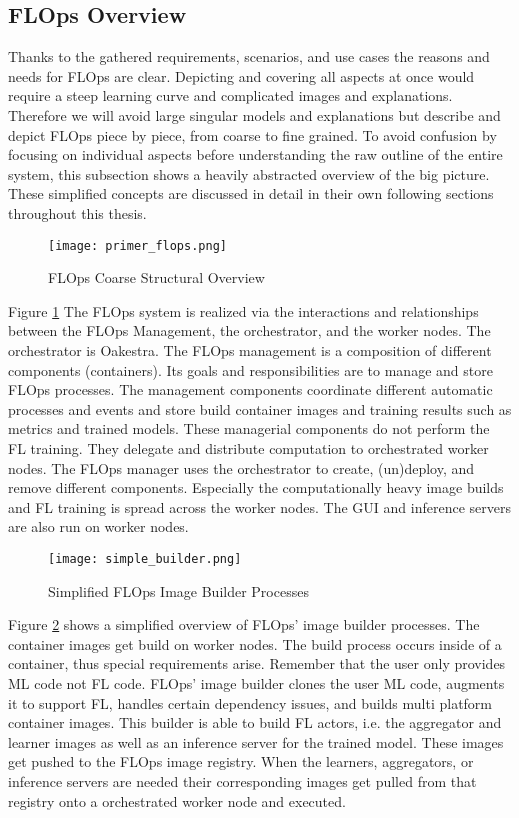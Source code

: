 \subsection{FLOps Overview}

Thanks to the gathered requirements, scenarios, and use cases the reasons and needs for FLOps are clear.
Depicting and covering all aspects at once would require a steep learning curve and complicated images and explanations.
Therefore we will avoid large singular models and explanations but describe and depict FLOps piece by piece, from coarse to fine grained.
To avoid confusion by focusing on individual aspects before understanding the raw outline of the entire system,
this subsection shows a heavily abstracted overview of the big picture.
These simplified concepts are discussed in detail in their own following sections throughout this thesis.

\begin{figure}[h]
    \centering
    \texttt{[image: primer\_flops.png]}
    \caption{FLOps Coarse Structural Overview}
    \label{fig:flops_structure_overview}
\end{figure}

Figure \ref{fig:flops_structure_overview}
The FLOps system is realized via the interactions and relationships between the FLOps Management, the orchestrator, and the worker nodes.
The orchestrator is Oakestra.
The FLOps management is a composition of different components (containers).
Its goals and responsibilities are to manage and store FLOps processes.
The management components coordinate different automatic processes and events and store build container images and training results such as metrics and trained models.
These managerial components do not perform the FL training.
They delegate and distribute computation to orchestrated worker nodes.
The FLOps manager uses the orchestrator to create, (un)deploy, and remove different components.
Especially the computationally heavy image builds and FL training is spread across the worker nodes.
The GUI and inference servers are also run on worker nodes.

\begin{figure}[h]
    \centering
    \texttt{[image: simple\_builder.png]}
    \caption{Simplified FLOps Image Builder Processes}
    \label{fig:flops_simple_image_builder}
\end{figure}

Figure \ref{fig:flops_simple_image_builder} shows a simplified overview of FLOps' image builder processes.
The container images get build on worker nodes.
The build process occurs inside of a container, thus special requirements arise.
Remember that the user only provides ML code not FL code.
FLOps' image builder clones the user ML code, augments it to support FL, handles certain dependency issues, and builds multi platform container images.
This builder is able to build FL actors, i.e. the aggregator and learner images as well as an inference server for the trained model.
These images get pushed to the FLOps image registry.
When the learners, aggregators, or inference servers are needed their corresponding images get pulled from that registry onto a orchestrated worker node and executed.

